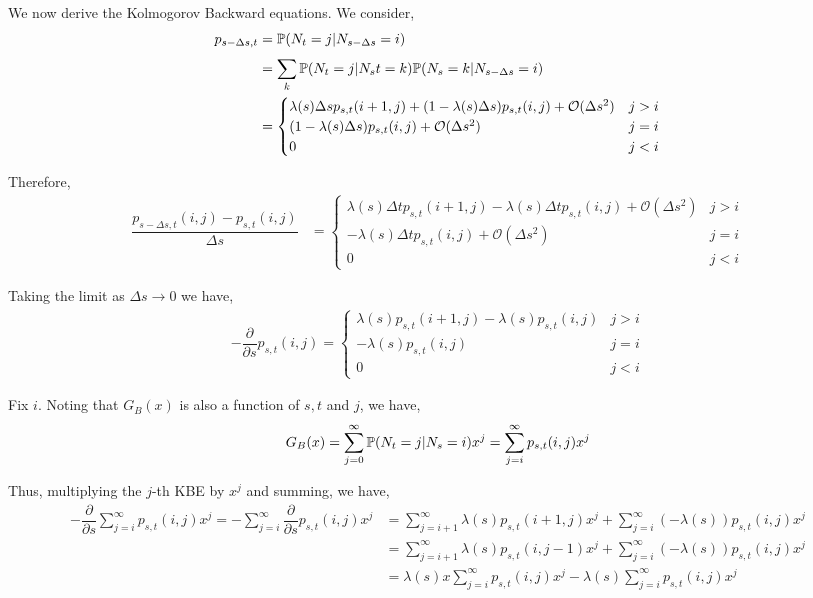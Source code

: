 \documentclass[10pt]{article}
\begin{document}
\begin{solution}[Solution]
We now derive the Kolmogorov Backward equations. We consider,
\begin{align*}
    p_{s-\Delta s,t} &= \mathbb{P}( N_{t} = j | N_{s-\Delta s} = i) \\
    &= \sum_{k}^{} \mathbb{P}(N_{t}=j | N_{s}t = k)\mathbb{P}(N_{s}=k | N_{s-\Delta s}=i) \\
    &= \begin{cases}
        \lambda(s)\Delta s p_{s,t}(i+1,j) 
        +(1-\lambda(s)\Delta s) p_{s,t}(i,j) + \mathcal{O}(\Delta s^2) & j > i \\
        (1-\lambda(s)\Delta s) p_{s,t}(i,j) +\mathcal{O}(\Delta s^2) & j=i \\
        0 & j < i
    \end{cases}
\end{align*}

Therefore,
\begin{align*}
    \dfrac{p_{s-\Delta s,t}(i,j) - p_{s,t}(i,j)}{\Delta s} 
    &= \begin{cases}
        \lambda(s)\Delta t p_{s,t}(i+1,j) 
        -\lambda(s)\Delta t p_{s,t}(i,j) + \mathcal{O}(\Delta s^2) & j > i \\
        -\lambda(s)\Delta t p_{s,t}(i,j) +\mathcal{O}(\Delta s^2) & j=i \\
        0 & j < i
    \end{cases}
\end{align*}

Taking the limit as \( \Delta s \to 0  \) we have,
\begin{align*}
    -\dfrac{\partial}{\partial s}p_{s,t}(i,j) = 
    \begin{cases}
        \lambda(s) p_{s,t}(i+1,j) 
        -\lambda(s)p_{s,t}(i,j) & j > i \\
        -\lambda(s)p_{s,t}(i,j) & j=i \\
        0 & j < i
    \end{cases}
\end{align*}

Fix \( i \). Noting that \( G_B(x) \) is also a function of \( s,t \) and \( j \), we have,
\begin{align*}
    G_B(x) = \sum_{j=0}^{\infty} \mathbb{P}(N_t = j | N_s = i) x^{j} = \sum_{j=i}^{\infty}p_{s,t}(i,j) x^{j} 
\end{align*}

Thus, multiplying the \( j \)-th KBE by \( x^j \) and summing, we have,
\begin{align*}
    -\dfrac{\partial}{\partial s} \sum_{j=i}^{\infty} p_{s,t}(i,j)x^j = 
    -\sum_{j=i}^{\infty} \dfrac{\partial}{\partial s} p_{s,t}(i,j)x^j 
    &= \sum_{j=i+1}^{\infty} \lambda(s) p_{s,t}(i+1,j) x^{j} + \sum_{j=i}^{\infty} (-\lambda(s)) p_{s,t}(i,j) x^j \\
    &= \sum_{j=i+1}^{\infty} \lambda(s) p_{s,t}(i,j-1) x^{j} + \sum_{j=i}^{\infty} (-\lambda(s)) p_{s,t}(i,j) x^j \\
    &= \lambda(s) x\sum_{j=i}^{\infty} p_{s,t}(i,j) x^{j} -\lambda(s) \sum_{j=i}^{\infty} p_{s,t}(i,j) x^j \\
\end{align*}


\end{solution}
\end{document}
